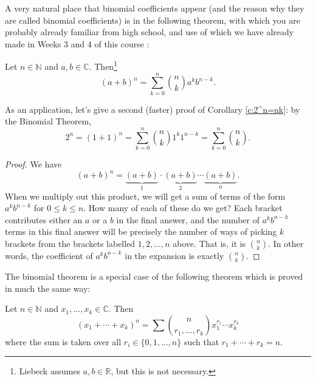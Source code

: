 \documentclass[11pt,dvipsnames]{book}
\numberwithin{figure}{section} %
\numberwithin{table}{section} %
\begin{document}
A very natural place that binomial coefficients appear (and the reason why they are called binomial coefficients) is in the following theorem, with which you are probably already familiar from high school, and use of which we have already made in Weeks 3 and 4 of this course :

\begin{theorem}
Let $n\in\mathbb{N}$ and $a,b\in \mathbb{C}$. Then\footnote{Liebeck assumes $a,b\in \mathbb{R}$, but this is not necessary. }
\begin{equation}
\label{e:binomialtheorem}
(a+b)^{n} = \sum_{k=0}^{n} {n\choose k} a^{k}b^{n-k}.
\end{equation}
\end{theorem}

As an application, let's give a second (faster) proof of Corollary \ref{c:2^n=nk}: by the Binomial Theorem,
\[
2^{n} = (1+1)^{n} =  \sum_{k=0}^{n} {n\choose k} 1^{k}1^{n-k}=\sum_{k=0}^{n} {n\choose k} .
\]

\begin{proof}
We have
\[ (a+b)^n =  \underbrace{(a + b)}_{1}\cdot \underbrace{(a+b)}_{2}\cdots \underbrace{(a+b)}_{n}.
\]
When we multiply out this product, we will get a sum of terms of the form $a^k b^{n-k}$ for $0 \leq k \leq n$. How many of each of these do we get? Each bracket contributes either an $a$ or a $b$ in the final answer, and the number of $a^k b^{n-k}$ terms
in this final answer will be precisely the number of ways of picking $k$ brackets from the brackets labelled $1,2 ,\dots , n$ above. That is, it is $n \choose k$. In other words, the coefficient of $a^k b^{n-k}$ in the expansion is exactly  $n \choose k$.
\end{proof}

The binomial theorem is a special case of the following theorem which is proved in much the same way:

\begin{theorem}
Let $n\in\mathbb{N}$ and $x_{1}, \dots ,x_{k}\in \mathbb{C}$. Then
\begin{equation}
\label{e:multinomialtheorem}
 (x_{1}+\cdots + x_{k})^{n} =
 \sum {n\choose r_{1},\dots ,r_{k}} x_1^{r_{1}}\cdots x_{k}^{r_{k}}
\end{equation}
where the sum is taken over all $r_{i}\in \{0,1, \dots ,n\}$ such that $r_{1}+\cdots + r_{k}=n$.
\end{theorem}
\end{document}
